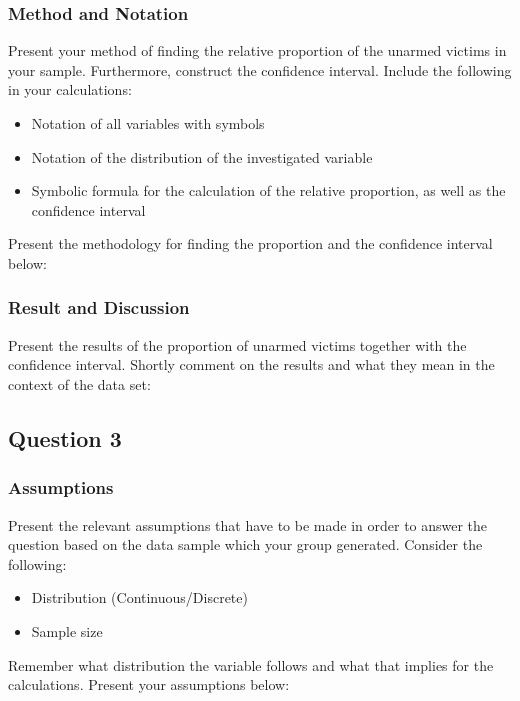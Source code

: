 \documentclass[a4paper, 10pt,serif]{article}
\begin{document}
\bigskip
\bigskip
\bigskip
\bigskip

\subsubsection*{Method and Notation}

Present your method of finding the relative proportion of the unarmed victims in your sample. 
Furthermore, construct the confidence interval. Include the following in your calculations:
\begin{itemize}
    \item Notation of all variables with symbols
    \item Notation of the distribution of the investigated variable
    \item Symbolic formula for the calculation of the relative proportion, as well as the confidence interval
\end{itemize}
Present the methodology for finding the proportion and the confidence interval below:

\bigskip
\bigskip
\bigskip
\bigskip

\subsubsection*{Result and Discussion}

Present the results of the proportion of unarmed victims together with the confidence interval. Shortly comment on the results and what they mean in the context of the data set:

\newpage
\subsection*{Question 3}

\subsubsection*{Assumptions}

Present the relevant assumptions that have to be made in order to answer the question based on the data sample which your group generated.
Consider the following:
\begin{itemize}
    \item Distribution (Continuous/Discrete)
    \item Sample size
\end{itemize}
Remember what distribution the variable follows and what that implies for the calculations. Present your assumptions below:
\end{document}
